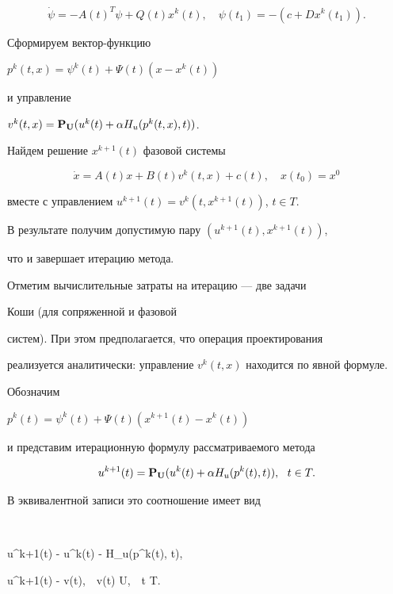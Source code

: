 $$


\Dot{\psi}=- A(t)^{T} \psi+Q(t) x^{k}(t),


\quad \psi(t_{1})=- (c+D x^{k}(t_{1})).


$$


Сформируем вектор-функцию


$p^{k}(t,x)=\psi^{k}(t)+\Psi(t)(x - x^{k}(t))$


и управление


$v^{k}(t,x)={\bold{P}_{\bold U}}(u^{k}(t)+\alpha H_{u}(p^{k}(t,x), t))$.





Найдем решение $x^{k+1}(t)$ фазовой системы


$$


\Dot{x}=A(t) x+B(t) v^{k}(t,x)+c(t),\quad x(t_{0})=x^{0}


$$


вместе с управлением $u^{k+1}(t)=v^{k}(t, x^{k+1}(t))$, $t \in T$.





В результате получим допустимую пару $(u^{k+1}(t), x^{k+1}(t))$,


что и завершает итерацию метода.





Отметим вычислительные затраты на итерацию --- две задачи 


Коши (для сопряженной и фазовой


систем). При этом предполагается, что операция проектирования


реализуется аналитически: управление $v^{k}(t,x)$ находится по явной формуле.





Обозначим


$p^{k}(t)=\psi^{k}(t)+\Psi(t)(x^{k+1}(t) - x^{k}(t))$


и представим итерационную формулу рассматриваемого метода


$$


u^{k+1}(t)={\bold{P}_{\bold U}}(u^{k}(t)+\alpha H_{u}(p^{k}(t),t)),\ \ t\in T.


$$


В эквивалентной записи это соотношение имеет вид


$$


\langle u^{k+1}(t) - u^{k}(t) - \alpha H_{u}(p^{k}(t), t),


u^{k+1}(t) - v(t)\rangle {},\ \ v(t) \in U,\ \ t \in T.


